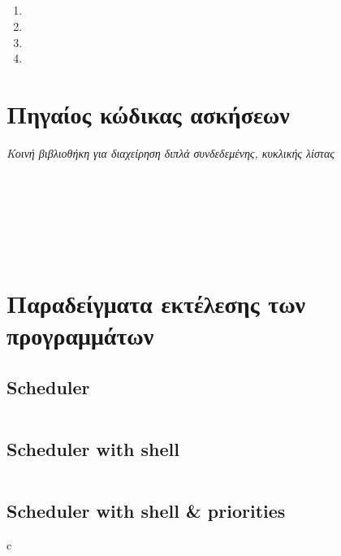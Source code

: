 \documentclass[a4paper,10pt]{article} \usepackage{anysize}
\begin{document}
\subsection{}
\begin{enumerate}
    \item 
    \item 
    \item 
    \item 
\end{enumerate}


\vspace{1cm}
\def\thesubsection {Άσκηση \arabic{section}.\arabic{subsection}}
\section*{Πηγαίος κώδικας ασκήσεων}
\emph{Κοινή βιβλιοθήκη για διαχείρηση διπλά συνδεδεμένης, κυκλικής λίστας}
\inputminted[linenos,fontsize=\footnotesize,frame=leftline]{c}{files/queue.h}
\inputminted[linenos,fontsize=\footnotesize,frame=leftline]{c}{files/queue.c}
\setcounter{section}{1}
\setcounter{subsection}{0}
\subsection{}
\inputminted[linenos,fontsize=\footnotesize,frame=leftline]{c}{files/scheduler_1.1.c}
\subsection{}
\inputminted[linenos,fontsize=\footnotesize,frame=leftline]{c}{files/scheduler-shell_1.2.c}
\subsection{}
\inputminted[linenos,fontsize=\footnotesize,frame=leftline]{c}{files/scheduler-shell_1.3.c}

\section*{Παραδείγματα εκτέλεσης των προγραμμάτων}
\def\thesubsection {Πρόγραμμα \arabic{section}.\arabic{subsection}:}
\setcounter{subsection}{0}
\subsection{Scheduler}
\inputminted[linenos,fontsize=\footnotesize,frame=leftline]{bash}{files/scheduler_1.1.out}
\subsection{Scheduler with shell}
\inputminted[linenos,fontsize=\footnotesize,frame=leftline]{bash}{files/scheduler-shell_1.2.out}
\subsection{Scheduler with shell \& priorities}
c
\end{document}
